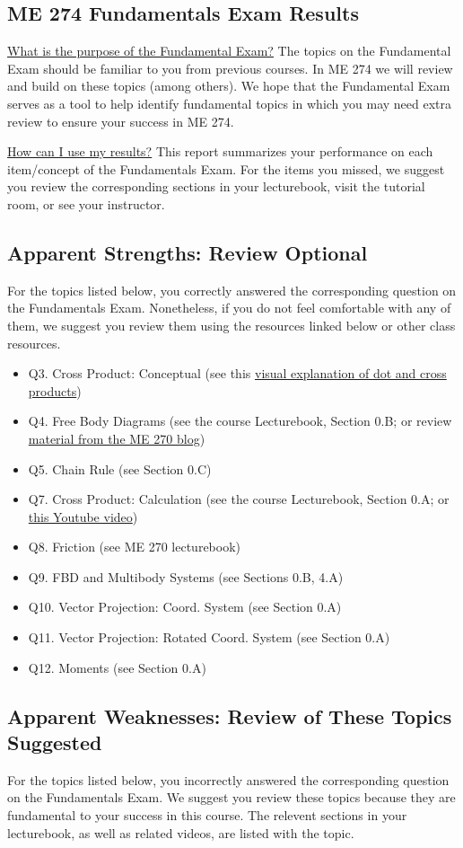 \documentclass[11pt,letterpaper]{article}\usepackage[]{graphicx}\usepackage[]{color}
\begin{document}
\subsection*{ME 274 Fundamentals Exam Results}
\underline{What is the purpose of the Fundamental Exam?}  The topics on the Fundamental Exam should be familiar to you from previous courses.  In ME 274 we will review and build on these topics (among others). We hope that the Fundamental Exam serves as a tool to help identify fundamental topics in which you may need extra review to ensure your success in ME 274.\

\underline{How can I use my results?}  This report summarizes your performance on each item/concept of the Fundamentals Exam.  For the items you missed, we suggest you review the corresponding sections in your lecturebook, visit the tutorial room, or see your instructor.

\subsection*{Apparent Strengths: Review Optional}
For the topics listed below, you correctly answered the corresponding question on the Fundamentals Exam.  Nonetheless, if you do not feel comfortable with any of them, we suggest you review them using the resources linked below or other class resources.

\begin{itemize}\item Q3. Cross Product: Conceptual (see this \href{https://www.youtube.com/watch?v=h0NJK4mEIJU&t=8s}{visual explanation of dot and cross products})
\item Q4. Free Body Diagrams (see the course Lecturebook, Section 0.B; or review \href{https://www.purdue.edu/statics/}{material from the ME 270 blog})
\item Q5. Chain Rule (see Section 0.C)
\item Q7. Cross Product: Calculation (see the course Lecturebook, Section 0.A; or \href{https://www.youtube.com/watch?v=DmPxjmymM7k}{this Youtube video})
\item Q8. Friction (see ME 270 lecturebook)
\item Q9. FBD and Multibody Systems (see Sections 0.B, 4.A)
\item Q10. Vector Projection: Coord. System (see Section 0.A)
\item Q11. Vector Projection: Rotated Coord. System (see Section 0.A)
\item Q12. Moments (see Section 0.A)
\end{itemize}\subsection*{Apparent Weaknesses: Review of These Topics Suggested}
For the topics listed below, you incorrectly answered the corresponding question on the Fundamentals Exam.  We suggest you review these topics because they are fundamental to your success in this course.  The relevent sections in your lecturebook, as well as related videos, are listed with the topic.
\end{document}
